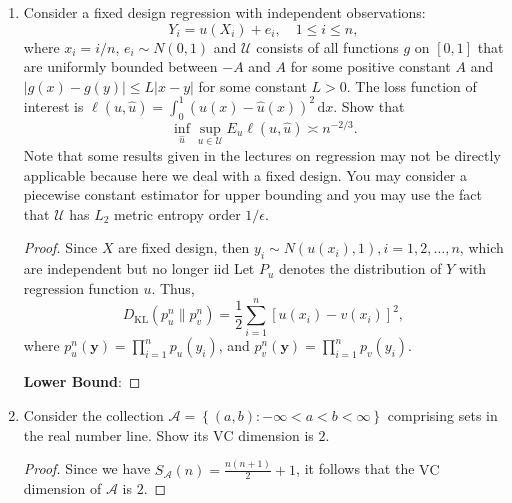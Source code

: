 \begin{enumerate}
	\item Consider a fixed design regression with independent observations:
	      \begin{equation*}
		      Y_{i}=u\left(X_{i}\right)+e_{i},\quad 1\leq i\leq n,
	      \end{equation*}
	      where $x_{i}=i/n$, $e_{i}\sim N(0,1)$ and $\mathcal{U}$ consists of all functions $g$ on $[0,1]$ that are uniformly bounded between $-A$ and $A$ for some positive constant $A$ and $|g(x)-g(y)|\leq L|x-y|$ for some constant $L>0$. The loss function of interest is $\ell(u,\hat{u})=\int_{0}^{1}(u(x)-\hat{u}(x))^{2}\,\mathrm{d}x$. Show that
	      \begin{equation*}
		      \inf_{\hat{u}}\sup_{u\in\mathcal{U}}E_{u}\ell(u,\hat{u})\asymp n^{-2/3}.
	      \end{equation*}
	      Note that some results given in the lectures on regression may not be directly applicable because here we deal with a fixed design. You may consider a piecewise constant estimator for upper bounding and you may use the fact that $\mathcal{U}$ has $L_{2}$ metric entropy order $1/\epsilon$.
	      \begin{proof}
		      Since $X$ are fixed design, then $y_{i}\sim N(u(x_{i}),1), i=1,2,\ldots,n$, which are independent but no longer iid  Let $P_{u}$ denotes the distribution of $Y$ with regression function $u$. Thus,
		      \begin{equation*}
			      D_{\text{KL}}\left(p_{u}^{n}\|p_{v}^{n}\right)=\frac{1}{2}\sum_{i=1}^{n}\left[u(x_{i})-v(x_{i})\right]^{2},
		      \end{equation*}
		      where $p_{u}^{n}(\mathbf{y})=\prod_{i=1}^{n}p_{u}(y_{i})$, and $p_{v}^{n}(\mathbf{y})=\prod_{i=1}^{n}p_{v}(y_{i})$.

		      \textbf{Lower Bound}:
	      \end{proof}
	\item Consider the collection $\mathcal{A}=\left\{(a,b):-\infty<a<b<\infty\right\}$ comprising sets in the real number line. Show its $\mathrm{VC}$ dimension is $2$.
	      \begin{proof}
		      Since we have $S_{\mathcal{A}}(n)=\frac{n(n+1)}{2}+1$, it follows that the $\mathrm{VC}$ dimension of $\mathcal{A}$ is $2$.
	      \end{proof}
\end{enumerate}
